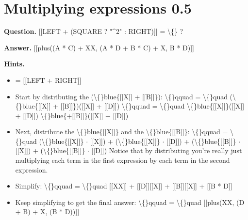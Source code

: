 \documentclass{article}
\begin{document}
\section*{Multiplying expressions 0.5}
\textbf{Question.} [[LEFT + (SQUARE ? "\textasciicircum{}2" : RIGHT)]] = \textbackslash\{\} ?

\textbf{Answer.} [[plus((A * C) + XX, (A * D + B * C) + X, B * D)]]

\textbf{Hints.}
\begin{itemize}
  \item = [[LEFT + RIGHT]]
  \item Start by distributing the (\textbackslash\{\}blue\{[[X]] + [[B]]\}):
                \textbackslash\{\}qquad = \textbackslash\{\}quad (\textbackslash\{\}blue\{[[X]] + [[B]]\})([[X]] + [[D]])
                \textbackslash\{\}qquad = \textbackslash\{\}quad \textbackslash\{\}blue\{[[X]]\}([[X]] + [[D]]) \textbackslash\{\}blue\{+[[B]]\}([[X]] + [[D]])
  \item Next, distribute the \textbackslash\{\}blue\{[[X]]\} and the \textbackslash\{\}blue\{[[B]]\}:
                \textbackslash\{\}qquad = \textbackslash\{\}quad (\textbackslash\{\}blue\{[[X]]\} $\cdot$ [[X]]) + (\textbackslash\{\}blue\{[[X]]\} $\cdot$ [[D]]) + (\textbackslash\{\}blue\{[[B]]\} $\cdot$ [[X]]) + (\textbackslash\{\}blue\{[[B]]\} $\cdot$ [[D]])
                Notice that by distributing you're really just multiplying each term in the first expression by each term in the second expression.
  \item Simplify:
                \textbackslash\{\}qquad = \textbackslash\{\}quad [[XX]] + [[D]][[X]] + [[B]][[X]] + [[B * D]]
  \item Keep simplifying to get the final answer:
                \textbackslash\{\}qquad = \textbackslash\{\}quad [[plus(XX, (D + B) + X, (B * D))]]
\end{itemize}
\end{document}
